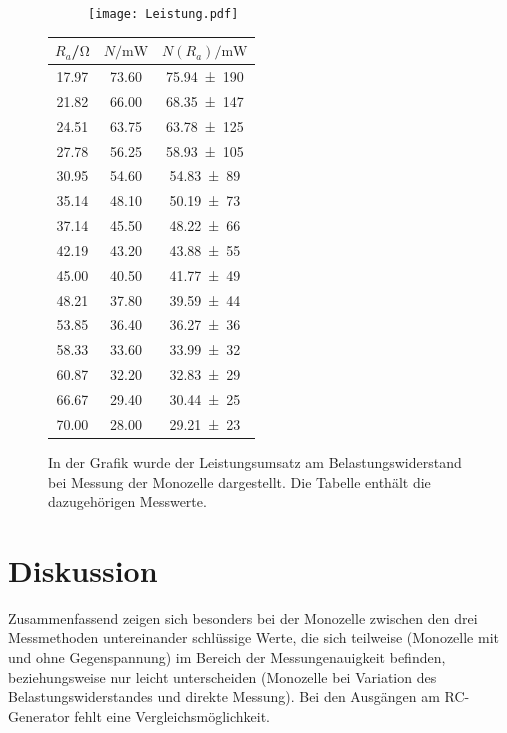 \begin{figure}[h]
  \begin{subfigure}{0.74\textwidth}
  \centering
    \texttt{[image: Leistung.pdf]}
    \label{sub:9}
    \qquad
  \end{subfigure}
  \begin{subtable}{0.25\textwidth}
  \centering
    \begin{tabular}{c c c}
    \toprule
    $R_a$/$\si{\ohm}$ & $N/\si{\milli\watt}$ & $N(R_a)/\si{\milli\watt}$ \\
    \midrule
    17.97 & 73.60 & \num{75,94(190)} \\
    21.82 & 66.00 & \num{68,35(147)} \\
    24.51 & 63.75 & \num{63,78(125)} \\
    27.78 & 56.25 & \num{58,93(105)} \\
    30.95 & 54.60 & \num{54,83(89)} \\
    35.14 & 48.10 & \num{50,19(73)} \\
    37.14 & 45.50 & \num{48,22(66)} \\
    42.19 & 43.20 & \num{43,88(55)} \\
    45.00 & 40.50 & \num{41,77(49)} \\
    48.21 & 37.80 & \num{39,59(44)} \\
    53.85 & 36.40 & \num{36,27(36)} \\
    58.33 & 33.60 & \num{33,99(32)} \\
    60.87 & 32.20 & \num{32,83(29)} \\
    66.67 & 29.40 & \num{30,44(25)} \\
    70.00 & 28.00 & \num{29,21(23)} \\
    \bottomrule
    \end{tabular}
    \label{sub:10}
    \qquad
  \end{subtable}
  \caption{In der Grafik wurde der Leistungsumsatz am Belastungswiderstand bei Messung der Monozelle
  dargestellt. Die Tabelle enthält die dazugehörigen Messwerte.}
  \label{tabplot:5}
\end{figure}

\section{Diskussion}
Zusammenfassend zeigen sich besonders bei der Monozelle zwischen den drei Messmethoden
untereinander schlüssige Werte, die sich teilweise (Monozelle mit und ohne Gegenspannung)
im Bereich der Messungenauigkeit befinden, beziehungsweise nur leicht unterscheiden (Monozelle bei Variation des Belastungswiderstandes
und direkte Messung). Bei den Ausgängen am RC-Generator fehlt eine Vergleichsmöglichkeit.

